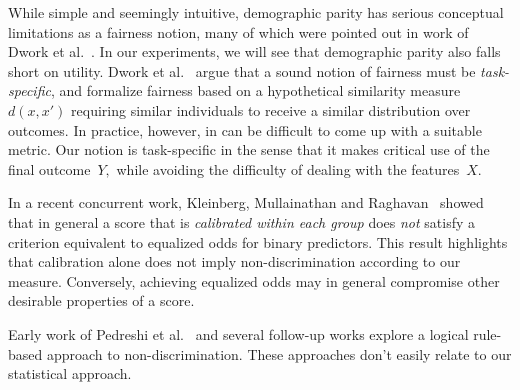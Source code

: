 While simple and seemingly intuitive, demographic parity has serious conceptual
limitations as a fairness notion, many of which were pointed out in work of
Dwork et al.~\cite{DworkHPRZ12}. In our experiments, we will see that
demographic parity also falls short on utility.  Dwork et al.~\cite{DworkHPRZ12}
argue that a sound notion of fairness must be \emph{task-specific}, and
formalize fairness based on a hypothetical similarity measure $d(x,x')$
requiring similar individuals to receive a similar distribution over outcomes.
In practice, however, in can be difficult to come up with a suitable metric.
Our notion is task-specific in the sense that it makes critical use of the final
outcome~$Y,$ while avoiding the difficulty of dealing with the features~$X.$

In a recent concurrent work, Kleinberg, Mullainathan and Raghavan~\cite{KleinbergMR16} showed that in general a score that is \emph{calibrated within each group} does \emph{not} satisfy a criterion equivalent to equalized odds for binary predictors. This result highlights that calibration alone does not imply non-discrimination according to our measure. Conversely, achieving equalized odds may in general compromise other desirable properties of a score.

Early work of Pedreshi et al.~\cite{PedreshiRT08} and several follow-up works
explore a logical rule-based approach to non-discrimination. These approaches
don't easily relate to our statistical approach.
